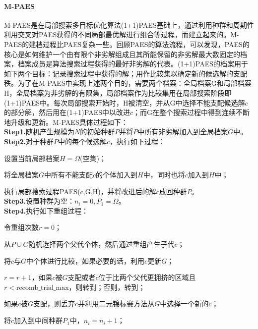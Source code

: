             \paragraph{M-PAES}
            M-PAES是在局部搜索多目标优化算法(1+1)PAES基础上，通过利用种群和周期性利用交叉对PAES获得的不同局部最优解进行组合等过程，而建立起来的。M-PAES的建档过程比PAES复杂一些。回顾PAES的算法流程，可以发现，PAES的核心是如何维护一个由有限个非劣解组成且其所能保留的非劣解最大数固定的档案，档案成员是算法搜索过程获得的最好非劣解的代表。(1+1)PAES的档案用于如下两个目标：记录搜索过程中获得的解；用作比较集以确定新的候选解的支配秩。为了在M-PAES中实现上述两个目的，需要两个档案：全局档案G和局部档案H，全局档案为非劣解的有限集，局部档案作为比较集用在局部搜索阶段即(1+1)PAES中。每次局部搜索开始时，H被清空，并从G中选择不能支配候选解$c$的部分解，然后用在(1+1)PAES中以改进$c$；而G在整个搜索过程中得到连续不断地升级和更新。M-PAES具体过程如下：\\
            \textbf{Step1.}随机产生规模为$N$的初始种群$P$并将$P$中所有非劣解加入到全局档案$G$中。\\
            \textbf{Step2.}对于种群$P$中的每个候选解$c$，执行如下过程：\par
            设置当前局部档案$H={\Omega}$(空集)；
            \par
            将全局档案$G$中所有不能支配$c$的个体加入到$H$中，同时也将$c$加入到$H$中；
            \par
            执行局部搜索过程PAES(c,G,H)，并将改进后的解$c$放回种群$P$。\\
            \textbf{Step3.}设置种群为空：$n_i=0,P_1={\Omega}$。\\
            \textbf{Step4.}执行如下重组过程：
            \par
            令重组次数$r=0$；
            \par
            从$P\cup G$随机选择两个父代个体，然后通过重组产生子代$c$；
            \par
            将$c$与$G$中个体进行比较，如果必要的话，利用$c$更新$G$；
            \par
            $r=r+1$，如果$c$被$G$支配或者$c$位于比两个父代更拥挤的区域且$r < \mathrm{recomb\_trial\_max}$，则转到；否则，转到；
            \par
            如果$c$被$G$支配，则丢弃$c$并利用二元锦标赛方法从$G$中选择一个新的$c$；
            \par
            将$c$加入到中间种群$P_1$中，$n_i=n_i+1$；
